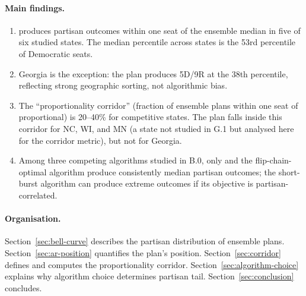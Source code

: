 \paragraph{Main findings.}
\begin{enumerate}
  \item \ar{} produces partisan outcomes within one seat of the \recom{}
    ensemble median in five of six studied states.  The median percentile
    across states is the 53rd percentile of Democratic seats.
  \item Georgia is the exception: the \ar{} plan produces 5D/9R at the
    38th percentile, reflecting strong geographic sorting, not algorithmic
    bias.
  \item The ``proportionality corridor'' (fraction of ensemble plans within
    one seat of proportional) is 20--40\% for competitive states.  The
    \ar{} plan falls inside this corridor for NC, WI, and MN (a state
    not studied in G.1 but analysed here for the corridor metric), but
    not for Georgia.
  \item Among three competing algorithms studied in B.0, only \ar{} and
    the flip-chain-optimal algorithm produce consistently median partisan
    outcomes; the short-burst algorithm can produce extreme outcomes if
    its objective is partisan-correlated.
\end{enumerate}

\paragraph{Organisation.}
Section~\ref{sec:bell-curve} describes the partisan distribution of ensemble
plans.  Section~\ref{sec:ar-position} quantifies the \ar{} plan's position.
Section~\ref{sec:corridor} defines and computes the proportionality corridor.
Section~\ref{sec:algorithm-choice} explains why algorithm choice determines
partisan tail.  Section~\ref{sec:conclusion} concludes.
